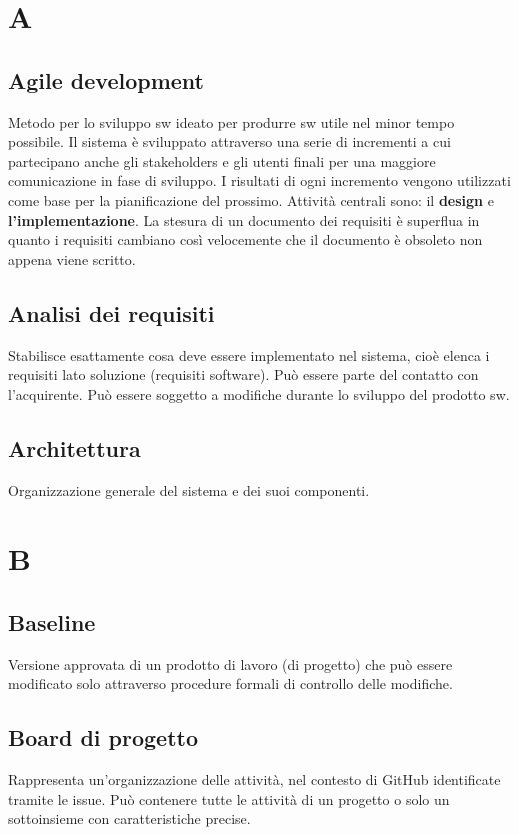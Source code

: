 \documentclass[a4paper,12pt]{article}
\begin{document}
\section{A}

\subsection*{Agile development}
Metodo per lo sviluppo sw ideato per produrre sw utile nel minor tempo possibile. Il sistema è sviluppato attraverso una serie di incrementi a cui partecipano anche gli stakeholders e gli utenti finali per una maggiore comunicazione in fase di sviluppo. I risultati di ogni incremento vengono utilizzati come base per la pianificazione del prossimo.  
Attività centrali sono: il \textbf{design} e \textbf{l'implementazione}.  
La stesura di un documento dei requisiti è superflua in quanto i requisiti cambiano così velocemente che il documento è obsoleto non appena viene scritto.

\subsection*{Analisi dei requisiti}
Stabilisce esattamente cosa deve essere implementato nel sistema, cioè elenca i requisiti lato soluzione (requisiti software).  
Può essere parte del contatto con l’acquirente.  
Può essere soggetto a modifiche durante lo sviluppo del prodotto sw.

\subsection*{Architettura}
Organizzazione generale del sistema e dei suoi componenti.

\clearpage

\section{B}

\subsection*{Baseline}
Versione approvata di un prodotto di lavoro (di progetto) che può essere modificato solo attraverso procedure formali di controllo delle modifiche.

\subsection*{Board di progetto}
Rappresenta un'organizzazione delle attività, nel contesto di GitHub identificate tramite le issue. Può contenere tutte le attività di un progetto o solo un sottoinsieme con caratteristiche precise.
\end{document}

